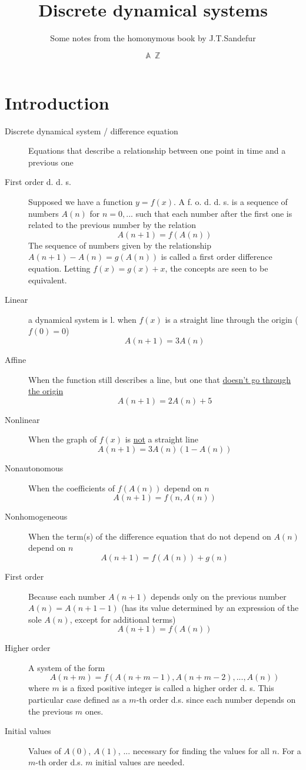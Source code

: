 \documentclass[12pt]{article}
\title{Discrete dynamical systems}
\author{Some notes from the homonymous book by J.T.Sandefur}
\date{$\mathbb{A} \enspace \mathbb{Z}$}
\begin{document}
\maketitle

\section{Introduction}
\begin{description}
\item[Discrete dynamical system / difference equation] Equations that describe a relationship between one point in time and a previous one
\item[First order d. d. s.] Supposed we have a function $y = f(x)$. A f. o. d. d. s. is a sequence of numbers $A(n)$ for $n = 0,...$ such that each number after the first one is related to the previous number by the relation \[A(n+1) = f(A(n))\]
The sequence of numbers given by the relationship $A(n+1) - A(n) = g(A(n))$ is called a first order difference equation. Letting $f(x) = g(x) + x$, the concepts are seen to be equivalent.
\item[Linear] a dynamical system is l. when $f(x)$ is a straight line through the origin ($f(0) = 0$)
\[A(n+1) = 3 A(n)\]
\item[Affine] When the function still describes a line, but one that \underline{doesn't go through the origin}
\[A(n+1) = 2A(n) +5\]
\item[Nonlinear] When the graph of $f(x)$ is \underline{not} a straight line
\[A(n+1) = 3A(n) (1-A(n))\]
\item[Nonautonomous] When the coefficients of $f(A(n))$ depend on $n$
\[A(n+1) = f(n, A(n))\]
\item[Nonhomogeneous] When the term(s) of the difference equation that do not depend on $A(n)$ depend on $n$
\[A(n+1) = f(A(n)) + g(n)\]
\item[First order] Because each number $A(n+1)$ depends only on the previous number $A(n) = A(n+1-1)$ (has its value determined by an expression of the sole $A(n)$, except for additional terms)
\[A(n+1) = f(A(n))\]
\item[Higher order] A system of the form \[A(n+m) = f(A(n+m-1), A(n+m-2), ..., A(n))\] where $m$ is a fixed positive integer is called a higher order d. s. This particular case defined as a $m$-th order d.s. since each number depends on the previous $m$ ones.
\item[Initial values] Values of $A(0)$, $A(1)$, ... necessary for finding the values for all $n$. For a $m$-th order d.s. $m$ initial values are needed.

\end{description}
\end{document}
